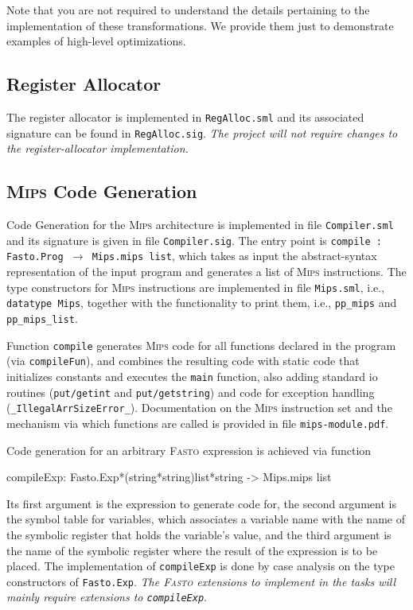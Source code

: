 \documentclass[a4paper,11pt]{article}
\newcommand{\fasto}{\textsc{Fasto}\xspace}
\newcommand{\mips}{\textsc{Mips}\xspace}
\begin{document}
Note that you are not required to understand the details pertaining to the
implementation of these transformations.   We provide them just to demonstrate
examples of high-level optimizations.

\subsection*{Register Allocator}

The register allocator is implemented in {\tt RegAlloc.sml}
and its associated signature can be found in {\tt RegAlloc.sig}.
{\it The project will not require changes to the register-allocator 
implementation.}

\subsection*{\mips Code Generation}

Code Generation for the \mips architecture is implemented in file 
{\tt Compiler.sml} and its signature is given in file {\tt Compiler.sig}. 
The entry point is {\tt compile : Fasto.Prog $\rightarrow$ Mips.mips list},
which takes as input the abstract-syntax representation of the input
program and generates a list of \mips instructions.
%
The type constructors for \mips instructions are implemented
in file {\tt Mips.sml}, i.e., {\tt datatype Mips}, together with 
the functionality to print them, i.e., {\tt pp\_mips} and
{\tt pp\_mips\_list}. 

Function {\tt compile} generates \mips code for all functions declared in the program
(via \texttt{compileFun}), and combines the resulting code
with static code that initializes constants and executes the \texttt{main} function,
also adding standard {\sc io} routines ({\tt put/getint} and {\tt put/getstring})
and code for exception handling ({\tt \_IllegalArrSizeError\_}).
%
Documentation on the \mips instruction set and the mechanism 
via which functions are called is provided in file {\tt mips-module.pdf}.

Code generation for an arbitrary \fasto expression is 
achieved via function
\vspace*{-2ex}
\begin{fancycode}
compileExp: Fasto.Exp*(string*string)list*string -> Mips.mips list
\end{fancycode}
\vspace*{-2ex}
Its first argument is the expression to generate code for,
the second argument is the symbol table for variables, 
which associates a variable name with the name of the symbolic
register that holds the variable's value, and the third 
argument is the name of the symbolic register where the result
of the expression is to be placed. The implementation of
{\tt compileExp} is done by case analysis on the type constructors
of {\tt Fasto.Exp}.   
{\it The \fasto 
extensions to implement in the tasks will mainly require
extensions to {\tt compileExp}}.
   
\end{document}
